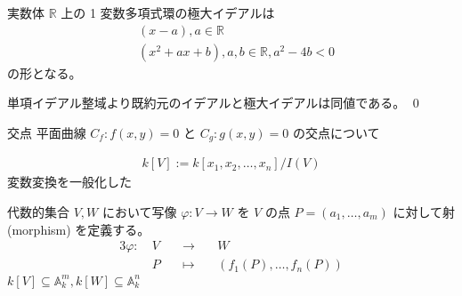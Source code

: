 \documentclass[uplatex,dvipdfmx,a4paper,11pt]{jlreq}
\makeatletter
\newcommand{\RR}{\mathbb{R}}
\renewcommand{\AA}{\mathbb{A}}
\numberwithin{equation}{section}
\theoremstyle{definition}
\renewenvironment{proof}[1][\proofname]{\par
  \normalfont
  \topsep6\p@\@plus6\p@ \trivlist
  \item[\hskip\labelsep{\bfseries #1}\@addpunct{\bfseries}]\ignorespaces\quad\par
}{%
  \qed\endtrivlist\@endpefalse
}
\renewcommand\proofname{証明}
\makeatother
\begin{document}
\begin{proposition}
  実数体 $\RR$ 上の 1 変数多項式環の極大イデアルは
  \begin{align}
     & (x - a), a\in\RR                        \\
     & (x^2 + ax + b), a,b\in\RR, a^2 - 4b < 0
  \end{align}
  の形となる。
\end{proposition}
\begin{proof}
  単項イデアル整域より既約元のイデアルと極大イデアルは同値である。
\end{proof}

\begin{itembox}[l]{交点}
  平面曲線 $C_f: f(x, y) = 0$ と $C_g: g(x, y) = 0$ の交点について
\end{itembox}

\begin{definition}[座標環]
  \begin{align}
    k[V] := k[x_1,x_2,\ldots,x_n]/I(V)
  \end{align}
  変数変換を一般化した

  代数的集合 $V, W$ において写像 $\varphi: V\to W$ を $V$ の点 $P = (a_1,\ldots,a_m)$ に対して射 (morphism) を定義する。
  \begin{alignat}{3}
    \varphi:\  & V \quad & \to\quad     & W                      \\
               & P \quad & \mapsto\quad & (f_1(P),\ldots,f_n(P))
  \end{alignat}
  $k[V] \subseteq \AA_k^m, k[W] \subseteq \AA_k^n$
\end{definition}
\end{document}
